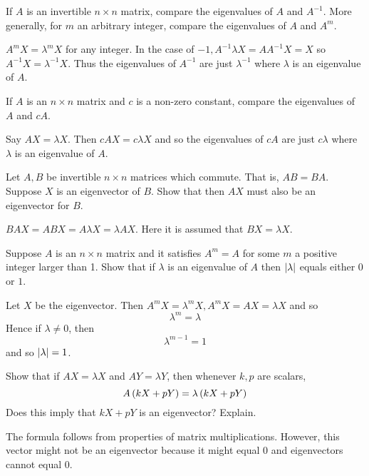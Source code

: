 \begin{enumialphparenastyle}

\begin{ex} If $A$ is an invertible $n\times n$ matrix, compare the eigenvalues of
$A$ and $A^{-1}$. More generally, for $m$ an arbitrary integer, compare the
eigenvalues of $A$ and $A^{m}$. \vspace{1mm}
\begin{sol}
$A^{m}X=\lambda ^{m}X$ for
any integer. In the case of $-1,A^{-1}\lambda X=AA^{-1}X=X$
so $A^{-1}X =\lambda ^{-1}X$. Thus the eigenvalues of $A^{-1}$ are just $\lambda ^{-1}$ where $\lambda $ is an eigenvalue of $A$.
\end{sol}
\end{ex} 

\begin{ex} If $A$ is an $n\times n$ matrix and $c$ is a non-zero constant, compare
the eigenvalues of $A$ and $cA$. \vspace{1mm} 
\begin{sol}
Say $AX=\lambda X$. Then $
cAX=c\lambda X$ and so the eigenvalues of $cA$ are just $
c\lambda $ where $\lambda $ is an eigenvalue of $A$.
\end{sol}
\end{ex}

\begin{ex} Let $A,B$ be invertible $n\times n$ matrices which commute. That is, $AB=BA$. Suppose $X$ is an eigenvector of $B$. Show that then 
$AX$ must also be an eigenvector for $B$. \vspace{1mm} 
\begin{sol}
 $BAX=ABX
=A\lambda X=\lambda AX$. Here it is assumed that $BX=\lambda X$.
\end{sol}
\end{ex}

\begin{ex} Suppose $A$ is an $n\times n$ matrix and it satisfies $A^{m}=A$ for
some $m$ a positive integer larger than 1. Show that if $\lambda $ is an
eigenvalue of $A$ then $\left|\lambda \right|$ equals either 0 or $
1$. \vspace{1mm}
\begin{sol}
Let $X$ be the eigenvector. Then $A^{m}X=\lambda ^{m}
X,A^{m}X=AX=\lambda X$ and so
\[
\lambda ^{m}=\lambda
\]
Hence if $\lambda \neq 0$, then
\[
\lambda ^{m-1}=1
\]
and so $\left|\lambda \right|=1$.
\end{sol}
\end{ex}

\begin{ex} Show that if $AX=\lambda X$ and $AY=\lambda Y$, then whenever $k,p$ are scalars,
\begin{equation*}
A\left(kX+pY\right) =\lambda \left(kX+pY\right) 
\end{equation*}
Does this imply that $kX+pY$ is an eigenvector? Explain.
\vspace{1mm} 
\begin{sol}
The formula follows from properties of matrix multiplications. However,
this vector might not be an eigenvector because it might equal $0$
and eigenvectors cannot equal $0$. 
\end{sol}
\end{ex}


\end{enumialphparenastyle}
